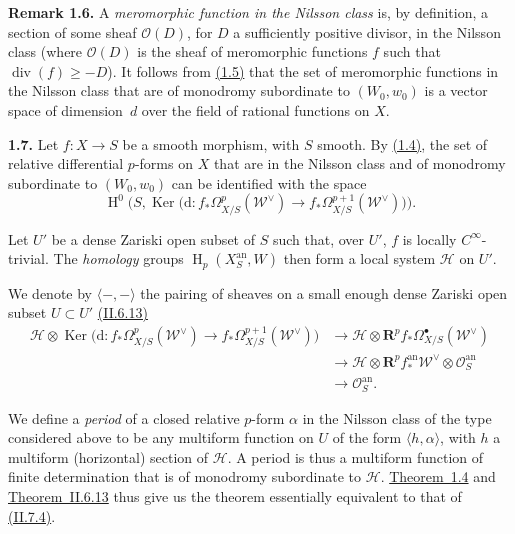 \documentclass{report}
\newenvironment{rmenv}[1]
  {\phantomsection\par\medskip\noindent\textbf{#1.}\rmfamily}
  {\par\medskip}
\newcommand{\scr}[1]{{\mathscr{#1}}}
\renewcommand{\cal}[1]{{\mathcal{#1}}}
\newcommand{\dd}{\mathrm{d}}
\newcommand{\RR}{\mathbf{R}}
\newcommand{\an}{\mathrm{an}}
\renewcommand{\geq}{\geqslant}
\DeclareMathOperator{\Ker}{Ker}
\DeclareMathOperator{\HH}{H}
\newcommand{\oldpage}[1]{\marginpar{\footnotesize$\Big\vert$ \textit{p.~#1}}}
\begin{document}
\begin{rmenv}{Remark 1.6}
\label{III.1.6}
  A \emph{meromorphic function in the Nilsson class} is, by definition, a section of some sheaf $\cal{O}(D)$, for $D$ a sufficiently positive divisor, in the Nilsson class (where $\cal{O}(D)$ is the sheaf of meromorphic functions $f$ such that $\operatorname{div}(f)\geq-D$).
  It follows from \hyperref[III.1.5]{(1.5)} that the set of meromorphic functions in the Nilsson class that are of monodromy subordinate to $(W_0,w_0)$ is a vector space of dimension~$d$ over the field of rational functions on $X$.
\end{rmenv}

\begin{rmenv}{1.7}
\label{III.1.7}
  Let $f\colon X\to S$ be a smooth morphism, with $S$ smooth.
  By \hyperref[III.1.4]{(1.4)}, the set of relative differential $p$-forms on $X$ that are in the Nilsson class and of monodromy subordinate to $(W_0,w_0)$ can be identified with the space
  \[
    \HH^0\Big(
      S,\Ker\big(
      \dd\colon f_*\Omega_{X/S}^p(\scr{W}^\vee)\to f_*\Omega_{X/S}^{p+1}(\scr{W}^\vee)
      \big)
    \Big).
  \]

  Let $U'$ be a dense Zariski open subset of $S$ such that, over $U'$, $f$ is locally $C^\infty$-trivial.
  The \emph{homology} groups $\HH_p(X_S^\an,W)$ then form a local system $\scr{H}$ on $U'$.

  We denote by $\langle-,-\rangle$ the pairing of sheaves on a small enough dense Zariski open subset $U\subset U'$ \hyperref[II.6.13]{(II.6.13)}
  \[
    \begin{aligned}
      \scr{H} \otimes \Ker\big(\dd\colon f_*\Omega_{X/S}^p(\scr{W}^\vee)\to f_*\Omega_{X/S}^{p+1}(\scr{W}^\vee)\big)
      &\to \scr{H} \otimes \RR^p f_* \Omega_{X/S}^\bullet(\scr{W}^\vee)
    \\&\to \scr{H} \otimes \RR^p f_*^\an \scr{W}^\vee \otimes \cal{O}_S^\an
    \\&\to \cal{O}_S^\an.
    \end{aligned}
  \]

\oldpage{125}
  We define a \emph{period} of a closed relative $p$-form $\alpha$ in the Nilsson class of the type considered above to be any multiform function on $U$ of the form $\langle h,\alpha\rangle$, with $h$ a multiform (horizontal) section of $\scr{H}$.
  A period is thus a multiform function of finite determination that is of monodromy subordinate to $\scr{H}$.
  \hyperref[III.1.4]{Theorem~1.4} and \hyperref[II.6.13]{Theorem~II.6.13} thus give us the theorem essentially equivalent to that of \hyperref[II.7.4]{(II.7.4)}.
\end{rmenv}
\end{document}
